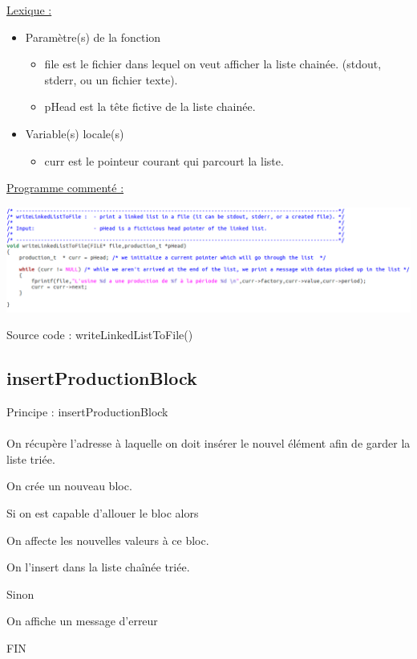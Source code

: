 \documentclass[a4paper]{article}
\newcommand\tab[1][1cm]{\hspace*{#1}}
\begin{document}
\underline{Lexique :}
\begin{itemize}
\item Paramètre(s) de la fonction  
\begin{itemize}
\item file est le fichier dans lequel on veut afficher la liste chainée. (stdout, stderr, ou un fichier texte).
\item pHead est la tête fictive de la liste chainée.
\end{itemize}
\item Variable(s) locale(s)
\begin{itemize}
\item curr est le pointeur courant qui parcourt la liste.
\end{itemize}
\end{itemize}

\underline{Programme commenté :}
\begin{center}
\includegraphics[scale=0.39]{writeLinkedListToFile.png}

Source code : writeLinkedListToFile()
\end{center}

\subsection{insertProductionBlock}
\begin{algorithm}
Principe : insertProductionBlock
\\
\\
\tab On récupère l'adresse à laquelle on doit insérer le nouvel élément afin de garder la liste triée.

\tab On crée un nouveau bloc.

\tab Si on est capable d'allouer le bloc alors

\tab \tab On affecte les nouvelles valeurs à ce bloc.

\tab \tab On l'insert dans la liste chaînée triée.

\tab Sinon 

\tab \tab On affiche un message d'erreur

FIN
\end{algorithm}
\end{document}
